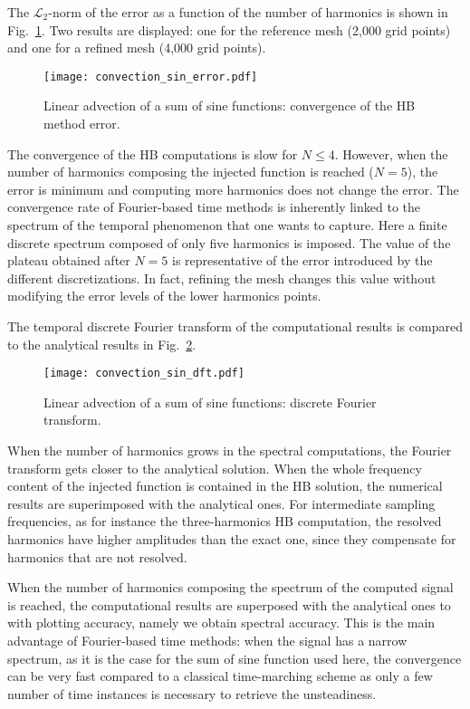 The $\mathcal{L}_2$-norm of the error as a function of the number of harmonics
is shown in Fig.~\ref{fig:conv_sum_sine}. Two results are displayed:
one for the reference mesh (2,000 grid points) and one for
a refined mesh (4,000 grid points).
\begin{figure}
  \centering
  \texttt{[image: convection\_sin\_error.pdf]}
  \caption{Linear advection of a sum of sine functions: convergence of the HB method error.}
  \label{fig:conv_sum_sine}
\end{figure}
The convergence of the HB computations is slow  for
$N \leq 4$. However, when the number of harmonics composing
the injected function is reached ($N=5$), the error is minimum and computing
more harmonics does not change the error.
The convergence rate 
of Fourier-based time methods is inherently linked to the spectrum of the
temporal phenomenon that one wants to capture. Here a finite discrete spectrum composed of only five harmonics
is imposed.
The value of the plateau obtained 
after $N=5$ is representative of the error introduced by the different
discretizations. In fact, refining the mesh changes this value
without modifying the error levels of the lower harmonics points.

The temporal discrete Fourier transform
of the computational results is compared to the
analytical results in Fig.~\ref{fig:dft_sin}.
\begin{figure}
  \centering
  \texttt{[image: convection\_sin\_dft.pdf]}
  \caption{Linear advection of a sum of sine functions: 
  discrete Fourier transform.}
  \label{fig:dft_sin}
\end{figure}
When the number of harmonics grows in the spectral computations,
the Fourier transform gets closer to the analytical solution.
When the whole frequency content of the injected 
function is contained in the HB solution, 
the numerical results are superimposed with the analytical ones.
For intermediate sampling frequencies, as for 
instance the three-harmonics HB computation, 
the resolved harmonics have higher amplitudes 
than the exact one, since they compensate for harmonics that are not resolved.

When the number of harmonics composing the spectrum of the
computed signal is reached, the computational results are superposed
with the analytical ones to with plotting accuracy, namely we obtain spectral accuracy.
This is the main advantage of Fourier-based time methods: when the
signal has a narrow spectrum, as it is the case for the sum
of sine function used here, the
convergence can be very fast compared to a classical time-marching scheme
as only a few number of time instances is necessary to retrieve the
unsteadiness.

